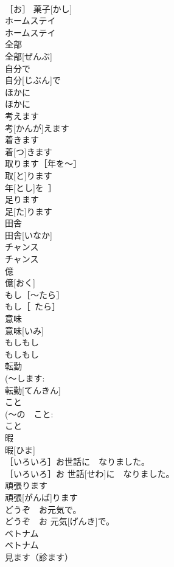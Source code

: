 \documentclass[8pt]{extreport}
\begin{document}
\begin{CJK}{UTF8}{min}
\\	［お］ 菓子[かし]	
\\	ホームステイ	
\\	ホームステイ	
\\	全部	
\\	全部[ぜんぶ]	
\\	自分で	
\\	自分[じぶん]で	
\\	ほかに	
\\	ほかに	
\\	考えます	
\\	考[かんが]えます	
\\	着きます	
\\	着[つ]きます	
\\	取ります［年を～］	
\\	取[と]ります
\\	年[とし]を~］	
\\	足ります	
\\	足[た]ります	
\\	田舎	
\\	田舎[いなか]	
\\	チャンス	
\\	チャンス	
\\	億	
\\	億[おく]	
\\	もし［～たら］	
\\	もし［~たら］	
\\	意味	
\\	意味[いみ]	
\\	もしもし	
\\	もしもし	
\\	転勤	
\\	(～します: 
\\	転勤[てんきん]	
\\	こと	
\\	(～の　こと: 
\\	こと	
\\	暇	
\\	暇[ひま]	
\\	［いろいろ］お世話に　なりました。	
\\	［いろいろ］お 世話[せわ]に　なりました。	
\\	頑張ります	
\\	頑張[がんば]ります	
\\	どうぞ　お元気で。	
\\	どうぞ　お 元気[げんき]で。	
\\	ベトナム	
\\	ベトナム	
\\	見ます（診ます）	

\end{CJK}
\end{document}
